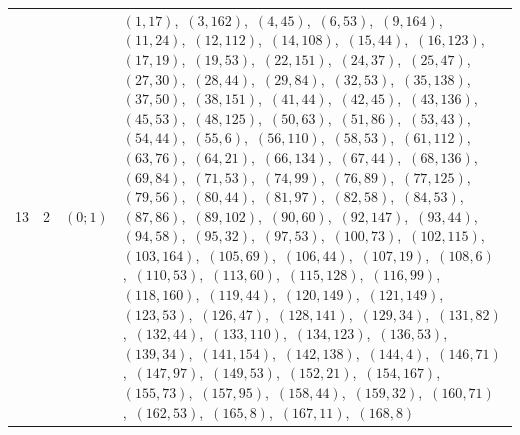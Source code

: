 \documentclass[11pt]{article}
\begin{document}
\begin{longtable}{@{}rrl>{\raggedright\arraybackslash}p{}@{}}
13 & 2 & $(0;1)$ & $(1,17)$,\allowbreak\ $(3,162)$,\allowbreak\ $(4,45)$,\allowbreak\ $(6,53)$,\allowbreak\ $(9,164)$,\allowbreak\ $(11,24)$,\allowbreak\ $(12,112)$,\allowbreak\ $(14,108)$,\allowbreak\ $(15,44)$,\allowbreak\ $(16,123)$,\allowbreak\ $(17,19)$,\allowbreak\ $(19,53)$,\allowbreak\ $(22,151)$,\allowbreak\ $(24,37)$,\allowbreak\ $(25,47)$,\allowbreak\ $(27,30)$,\allowbreak\ $(28,44)$,\allowbreak\ $(29,84)$,\allowbreak\ $(32,53)$,\allowbreak\ $(35,138)$,\allowbreak\ $(37,50)$,\allowbreak\ $(38,151)$,\allowbreak\ $(41,44)$,\allowbreak\ $(42,45)$,\allowbreak\ $(43,136)$,\allowbreak\ $(45,53)$,\allowbreak\ $(48,125)$,\allowbreak\ $(50,63)$,\allowbreak\ $(51,86)$,\allowbreak\ $(53,43)$,\allowbreak\ $(54,44)$,\allowbreak\ $(55,6)$,\allowbreak\ $(56,110)$,\allowbreak\ $(58,53)$,\allowbreak\ $(61,112)$,\allowbreak\ $(63,76)$,\allowbreak\ $(64,21)$,\allowbreak\ $(66,134)$,\allowbreak\ $(67,44)$,\allowbreak\ $(68,136)$,\allowbreak\ $(69,84)$,\allowbreak\ $(71,53)$,\allowbreak\ $(74,99)$,\allowbreak\ $(76,89)$,\allowbreak\ $(77,125)$,\allowbreak\ $(79,56)$,\allowbreak\ $(80,44)$,\allowbreak\ $(81,97)$,\allowbreak\ $(82,58)$,\allowbreak\ $(84,53)$,\allowbreak\ $(87,86)$,\allowbreak\ $(89,102)$,\allowbreak\ $(90,60)$,\allowbreak\ $(92,147)$,\allowbreak\ $(93,44)$,\allowbreak\ $(94,58)$,\allowbreak\ $(95,32)$,\allowbreak\ $(97,53)$,\allowbreak\ $(100,73)$,\allowbreak\ $(102,115)$,\allowbreak\ $(103,164)$,\allowbreak\ $(105,69)$,\allowbreak\ $(106,44)$,\allowbreak\ $(107,19)$,\allowbreak\ $(108,6)$,\allowbreak\ $(110,53)$,\allowbreak\ $(113,60)$,\allowbreak\ $(115,128)$,\allowbreak\ $(116,99)$,\allowbreak\ $(118,160)$,\allowbreak\ $(119,44)$,\allowbreak\ $(120,149)$,\allowbreak\ $(121,149)$,\allowbreak\ $(123,53)$,\allowbreak\ $(126,47)$,\allowbreak\ $(128,141)$,\allowbreak\ $(129,34)$,\allowbreak\ $(131,82)$,\allowbreak\ $(132,44)$,\allowbreak\ $(133,110)$,\allowbreak\ $(134,123)$,\allowbreak\ $(136,53)$,\allowbreak\ $(139,34)$,\allowbreak\ $(141,154)$,\allowbreak\ $(142,138)$,\allowbreak\ $(144,4)$,\allowbreak\ $(146,71)$,\allowbreak\ $(147,97)$,\allowbreak\ $(149,53)$,\allowbreak\ $(152,21)$,\allowbreak\ $(154,167)$,\allowbreak\ $(155,73)$,\allowbreak\ $(157,95)$,\allowbreak\ $(158,44)$,\allowbreak\ $(159,32)$,\allowbreak\ $(160,71)$,\allowbreak\ $(162,53)$,\allowbreak\ $(165,8)$,\allowbreak\ $(167,11)$,\allowbreak\ $(168,8)$\\

\end{longtable}
\end{document}
